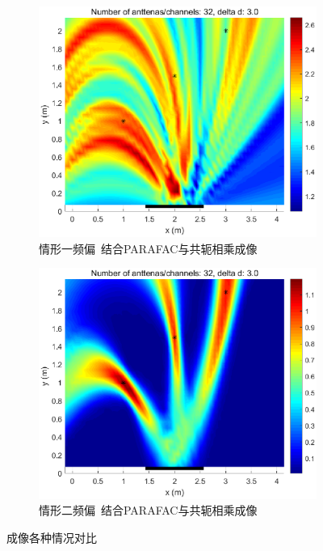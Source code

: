 \begin{figure}[H]
\begin{subfigure}[t]{.3\linewidth}
    \centering
    \includegraphics[width=1\textwidth]{figures/compare/TPF_CM_freq1.eps}
    \caption{情形一频偏~结合PARAFAC与共轭相乘成像}
  \end{subfigure}
  \begin{subfigure}[t]{.3\linewidth}
    \centering
    \includegraphics[width=1\textwidth]{figures/compare/TPF_CM_freq2.eps}
    \caption{情形二频偏~结合PARAFAC与共轭相乘成像}
  \end{subfigure}
  \caption{成像各种情况对比}\label{成像对比图}
\end{figure}